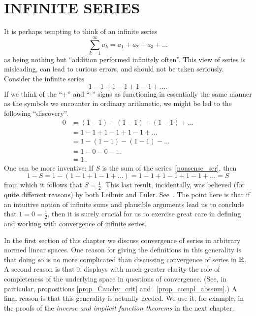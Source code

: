 \chapter{INFINITE SERIES}\label{inf_ser}

It is perhaps tempting to think of an infinite series
  \[ \sum_{k=1}^\infty a_k = a_1 + a_2 + a_3 + \dots \]
as being nothing but ``addition performed infinitely often''.  This view of series is
misleading, can lead to curious errors, and should not be taken seriously.  Consider the
infinite series
  \begin{equation}\label{nonsense_ser}
      1 - 1 + 1 - 1 + 1 - 1 + ...   .
  \end{equation}
If we think of the ``+'' and ``-'' signs as functioning in essentially the same manner as the
symbols we encounter in ordinary arithmetic, we might be led to the following ``discovery''.
  \begin{align}\label{nonsense_ser2}
           0 &=  (1 - 1) + (1 - 1) + (1 - 1) + \dots \\
             &= 1 - 1 + 1 - 1 + 1 - 1 + \dots \\
             &= 1 - (1 - 1) - (1 - 1) - \dots \\
             &= 1 - 0 - 0 - \dots \\
             &=1\,.
  \end{align}
One can be more inventive: If $S$ is the sum of the series~\eqref{nonsense_ser}, then
  \[ 1 - S = 1 - (1 - 1 + 1 - 1 + \dots) = 1 - 1 + 1 - 1 + 1 - 1 + \dots = S \]
from which it follows that $S = \frac12$.  This last result, incidentally, was believed (for
quite different reasons) by both Leibniz and Euler.  See~\cite{Moore:1932}. The point here is
that if an intuitive notion of infinite sums and plausible arguments lead us to conclude that
$1 = 0 = \frac12$, then it is surely crucial for us to exercise great care in defining and
working with convergence of infinite series.

In the first section of this chapter we discuss convergence of series in arbitrary normed
linear spaces.  One reason for giving the definitions in this generality is that doing so is
no more complicated than discussing convergence of series in $\mathbb{R}$.  A second reason is that it
displays with much greater clarity the role of completeness of the underlying space in
questions of convergence.  (See, in particular, propositions \ref{prop_Cauchy_crit} and
~\ref{prop_compl_abssum}.)  A final reason is that this generality is actually needed.  We use
it, for example, in the proofs of the \emph{inverse and implicit function theorems} in the
next chapter.






